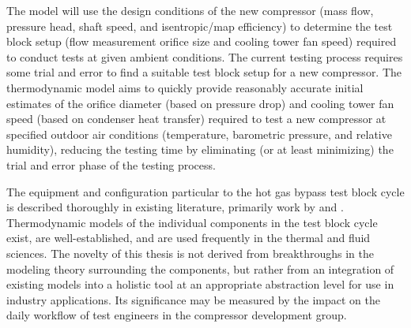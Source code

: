 The model will use the design conditions of the new compressor 
(mass flow, pressure head, shaft speed, and isentropic/map efficiency) 
to determine the test block setup 
(flow measurement orifice size and cooling tower fan speed) 
required to conduct tests at given ambient conditions. 
The current testing process requires some trial and error 
to find a suitable test block setup for a new compressor. 
The thermodynamic model aims to quickly provide reasonably accurate 
initial estimates of the orifice diameter (based on pressure drop) 
and cooling tower fan speed (based on condenser heat transfer) 
required to test a new compressor at specified outdoor air conditions
(temperature, barometric pressure, and relative humidity), 
reducing the testing time by eliminating (or at least minimizing) 
the trial and error phase of the testing process.

The equipment and configuration particular to the hot gas bypass test block
cycle is described thoroughly in existing literature, primarily work by
\citet{mcgovern1984} and \citet{sahs1956}.
Thermodynamic models of the individual components in the test block cycle exist, 
are well-established, and are used frequently in the thermal and fluid sciences.
The novelty of this thesis is not derived from breakthroughs in the modeling theory
surrounding the components, but rather from an integration of existing models
into a holistic tool at an appropriate abstraction level 
for use in industry applications.
Its significance may be measured by the impact on the daily workflow
of test engineers in the compressor development group.

